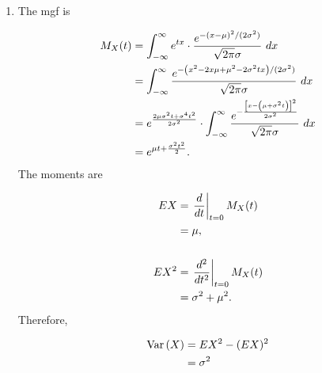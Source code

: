 \documentclass[12pt,letterpaper,reqno]{amsart}
\numberwithin{equation}{subsection}
\begin{document}
\begin{enumerate}[label=(\alph*),leftmargin=*]
    \item The mgf is
    
    \begin{align*}
        \fun{M_X}{t} &= \myint{e^{tx} \cdot \frac{e^{-(x-\mu)^2/(2 \sigma^2)}}{\sqrt{2\pi} \sigma}}{x}{-\infty}{\infty} \\
        &= \myint{\frac{e^{- \left( x^2 - 2x \mu + \mu^2 - 2 \sigma^2 tx \right)/(2 \sigma^2)}}{\sqrt{2\pi} \sigma}}{x}{-\infty}{\infty} \\
        &= e^{ \frac{2\mu \sigma^2t + \sigma^4 t^2}{2 \sigma^2}} \cdot \myint{\frac{e^{-\frac{\left[ x - \left( \mu + \sigma^2 t \right) \right]^2}{2 \sigma^2}}}{\sqrt{2\pi} \sigma}}{x}{-\infty}{\infty} \\
        &= e^{\mu t + \frac{\sigma^2 t^2}{2}}.
    \end{align*}
    The moments are
    
    \begin{align*}
        EX &= \left. \Dif{}{t} \right\vert_{t=0} \fun{M_X}{t} \\
        &= \mu, \\
        \\
        EX^2 &= \left. \Dif{^2}{t^2} \right\vert_{t=0}  \fun{M_X}{t} \\
        &= \sigma^2 + \mu^2.
    \end{align*}
    Therefore,
    
    \begin{align*}
        \Var{X} &= EX^2 - (EX)^2 \\
                &= \sigma^2
    \end{align*}
\end{enumerate}

\newpage
\nocite{*}
\printbibliography
\end{document}
